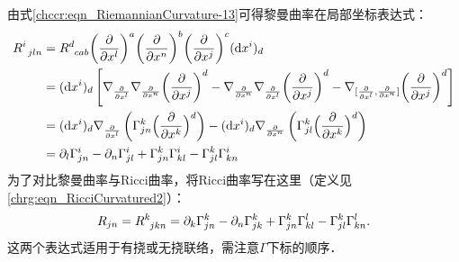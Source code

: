 
由式\eqref{chccr:eqn_RiemannianCurvature-13}可得黎曼曲率在局部坐标表达式：
\begin{align}
    R_{\hphantom{a} jln}^i &=R_{\hphantom{a} cab}^d {\left( {\frac{\partial }{{\partial {x^l}}}} \right)^a}
    {\left( {\frac{\partial }{{\partial {x^n}}}} \right)^b}
    {\left( {\frac{\partial }{{\partial {x^j}}}} \right)^c} {({\rm d}x^i)_d} \notag\\
    &= {({\rm d}x^i)_d} \left[\nabla _{\frac{\partial }{\partial x^l} }
    \nabla _{\frac{\partial }{\partial x^n}} {\left( {\frac{\partial }{{\partial {x^j}}}} \right)^d}
    - {\nabla _{\frac{\partial }{\partial x^n}}}
    {\nabla _{\frac{\partial }{\partial x^l}}}{\left( {\frac{\partial }{{\partial {x^j}}}} \right)^d}
    - {\nabla _{[\frac{\partial }{\partial x^l},\frac{\partial }{\partial x^n}]}}
    {\left( {\frac{\partial }{{\partial {x^j}}}} \right)^d}\right] \notag \\
    &= {({\rm d}x^i)_d}{\nabla _{\frac{\partial }{\partial x^l}}} \left(\Gamma_{jn}^{k}
    {\Bigl( {\frac{\partial }{{\partial {x^k}}}} \Bigr)^d} \right)
    -{({\rm d}x^i)_d} {\nabla _{\frac{\partial }{\partial x^n}}} \left(\Gamma_{jl}^{k}
    {\Bigl( {\frac{\partial }{{\partial {x^k}}}} \Bigr)^d} \right) \notag\\
    &= {\partial_l} \Gamma_{jn}^{i} -\partial_n \Gamma_{jl}^{i}+ \Gamma_{jn}^{k} \Gamma_{kl}^{i}
    - \Gamma_{jl}^{k}\Gamma_{kn}^{i} \label{chccr:eqn_Riemannian13-component}
\end{align}
为了对比黎曼曲率与Ricci曲率，将Ricci曲率写在这里（定义见\eqref{chrg:eqn_RicciCurvatured2}）：
\begin{equation}\label{chccr:eqn_Ricci-component}
    R_{jn} = R_{\hphantom{a} jkn}^k = {\partial_k} \Gamma_{jn}^{k} -\partial_n \Gamma_{jk}^{k}
    + \Gamma_{jn}^{k} \Gamma_{kl}^{l}- \Gamma_{jl}^{k}\Gamma_{kn}^{l} .
\end{equation}
这两个表达式适用于有挠或无挠联络，需注意$\Gamma$下标的顺序．


